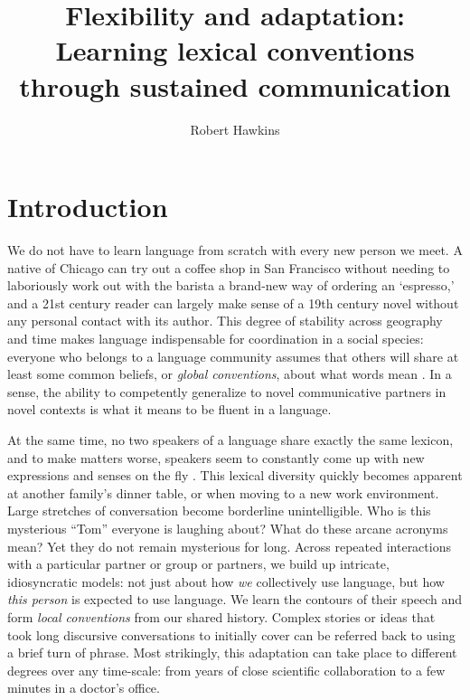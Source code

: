 \documentclass[11pt, floatsintext, jou]{apa6}
\title{Flexibility and adaptation: \\Learning lexical conventions through sustained communication}
\author{Robert Hawkins}
\affiliation{Stanford University}
\begin{document}
\maketitle

\section{Introduction}%

We do not have to learn language from scratch with every new person we meet. A native of Chicago can try out a coffee shop in San Francisco without needing to laboriously work out with the barista a brand-new way of ordering an `espresso,' and a 21st century reader can largely make sense of a 19th century novel without any personal contact with its author. This degree of stability across geography and time makes language indispensable for coordination in a social species: everyone who belongs to a language community assumes that others will share at least some common beliefs, or \emph{global conventions}, about what words mean \cite{Lewis69_Convention}. In a sense, the ability to competently generalize to novel communicative partners in novel contexts is what it means to be fluent in a language.

At the same time, no two speakers of a language share exactly the same lexicon, and to make matters worse, speakers seem to constantly come up with new expressions and senses on the fly \cite{Davidson86_DerangementOfEpitaphs, Clark98_CommunalLexicons}. This lexical diversity quickly becomes apparent at another family's dinner table, or when moving to a new work environment. Large stretches of conversation become borderline unintelligible. Who is this mysterious ``Tom'' everyone is laughing about? What do these arcane acronyms mean? Yet they do not remain mysterious for long. Across repeated interactions with a particular partner or group or partners, we build up intricate, idiosyncratic models: not just about how \emph{we} collectively use language, but how \emph{this person} is expected to use language. We learn the contours of their speech and form \emph{local conventions} from our shared history. Complex stories or ideas that took long discursive conversations to initially cover can be referred back to using a brief turn of phrase. Most strikingly, this adaptation can take place to different degrees over any time-scale: from years of close scientific collaboration to a few minutes in a doctor's office.
\end{document}
